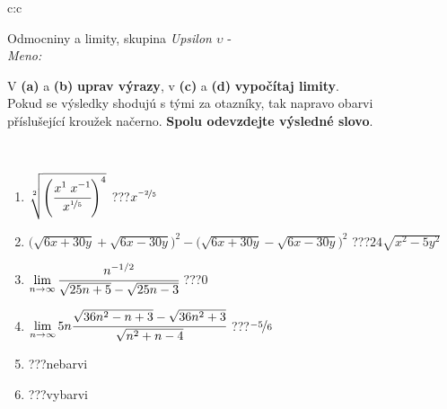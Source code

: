 \documentclass[10pt]{report}
\begin{document}
\newpage
\thispagestyle{empty}
\begin{tabular}{c:c}
\begin{minipage}[c][104.5mm][t]{0.5\linewidth}
\begin{center}
\vspace{7mm}
{\huge Odmocniny a limity, skupina \textit{Upsilon $\upsilon$} -}\\[5mm]
\textit{Meno:}\phantom{xxxxxxxxxxxxxxxxxxxxxxxxxxxxxxxxxxxxxxxxxxxxxxxxxxxxxxxxxxxxxxxxx}\\[5mm]
\begin{minipage}{0.95\linewidth}
\begin{center}
V \textbf{(a)} a \textbf{(b)} \textbf{uprav výrazy}, v \textbf{(c)} a \textbf{(d)} \textbf{vypočítaj limity}.\\Pokud se výsledky shodujú s tými za otazníky, tak napravo obarvi\\příslušející kroužek načerno. \textbf{Spolu odevzdejte výsledné slovo}.
\end{center}
\end{minipage}
\\[1mm]
\begin{minipage}{0.79\linewidth}
\begin{center}
\begin{varwidth}{\linewidth}
\begin{enumerate}
\small
\item $\sqrt[2]{\left(\cfrac{x^{1}\;x^{-1}}{x^{\nicefrac{1}{5}}}\right)^{4}}$\quad \dotfill\; ???\;\dotfill \quad $x^{\nicefrac{-2}{5}}$
\item {\footnotesize{\scriptsize$\big(\sqrt{6x+30y}+\sqrt{6x-30y}\big)^2-\big(\sqrt{6x+30y}-\sqrt{6x-30y}\big)^2$}\quad \dotfill\; ???\;\dotfill \quad $24\sqrt{x^2-5y^2}$}
\item $\lim\limits_{n\to\infty}\cfrac{n^{-1/2}}{\sqrt{25n+5}-\sqrt{25n-3}}$\quad \dotfill\; ???\;\dotfill \quad $0$
\item $\lim\limits_{n\to\infty}5n\cfrac{\sqrt{36n^2-n+3}-\sqrt{36n^2+3}}{\sqrt{n^2+n-4}}$\quad \dotfill\; ???\;\dotfill \quad $\nicefrac{-5}{6}$
\item \quad \dotfill\; ???\;\dotfill \quad nebarvi
\item \quad \dotfill\; ???\;\dotfill \quad vybarvi
\end{enumerate}
\end{varwidth}
\end{center}
\end{minipage}
\begin{minipage}{0.20\linewidth}

\end{minipage}
\end{center}
\end{minipage}
\end{tabular}
\end{document}
